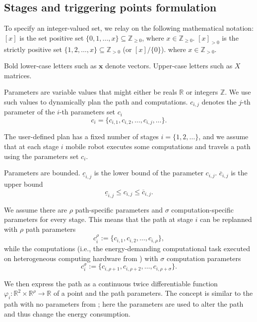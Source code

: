 \subsection{Stages and triggering points formulation}

To specify an integer-valued set, we relay on the following mathematical notation: $[x]$ is the set positive set $\{0,1,\dots,x\}\subseteq\mathbb{Z}_{\geq 0}$, where $x\in\mathbb{Z}_{\geq 0}$. $[x]_{>0}$ is the strictly positive set $\{1,2,\dots,x\}\subseteq\mathbb{Z}_{> 0}$ (or $[x]/\{0\}$). where $x\in\mathbb{Z}_{>0}$. 

Bold lower-case letters such as $\mathbf{x}$ denote vectors. Upper-case letters such as $X$ matrices.

Parameters are variable values that might either be reals $\mathbb{R}$ or integers $\mathbb{Z}$. We use such values to dynamically plan the path and computations. $c_{i,j}$ denotes the $j$-th parameter of the $i$-th parameters set $c_i$
\begin{equation}
  c_i=\{c_{i,1},c_{i,2},\dots,c_{i,j},\dots\}.
\end{equation}

The user-defined plan has a fixed number of stages $i=\{1,2,\dots\}$, and we assume that at each stage $i$ mobile robot executes some computations and travels a path using the parameters set $c_i$.

Parameters are bounded. $\underline{c}_{i,j}$ is the lower bound of the parameter $c_{i,j}$. $\overline{c}_{i,j}$ is the upper bound
\begin{equation}
  \underline{c}_{i,j}\leq c_{i,j}\leq\overline{c}_{i,j}.
\end{equation}

We assume there are $\rho$ path-specific parameters and $\sigma$ computation-specific parameters for every stage. This means that the path at stage $i$ can be replanned with $\rho$ path parameters
\begin{equation}\label{eq:path-params}
    c_i^\rho:=\{c_{i,1},c_{i,2},\dots,c_{i,\rho}\},
\end{equation}
while the computations (i.e., the energy-demanding computational task executed on heterogeneous computing hardware from ) with $\sigma$ computation parameters 
\begin{equation}\label{eq:comp-params}
    c_i^\sigma:=\{c_{i,\rho+1},c_{i,\rho+2},\dots,c_{i,\rho+\sigma}\}.
\end{equation}

We then express the path as a continuous twice differentiable function $\varphi_i:\mathbb{R}^2\times\mathbb{R}^\rho\rightarrow\mathbb{R}$ of a point and the path parameters. The concept is similar to the path with no parameters from ; here the parameters are used to alter the path and thus change the energy consumption. 

